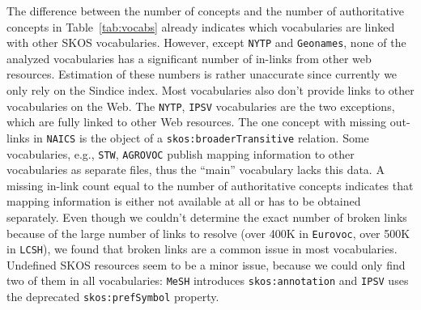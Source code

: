 
The difference between the number of concepts and the number of authoritative concepts in Table~\ref{tab:vocabs} already indicates which vocabularies are linked with other SKOS vocabularies.
However, except \texttt{NYTP} and \texttt{Geonames}, none of the analyzed vocabularies has a significant number of in-links from other web resources. Estimation of these numbers is rather unaccurate since currently we only rely on the Sindice index. 
Most vocabularies also don't provide links to other vocabularies on the Web. The \texttt{NYTP}, \texttt{IPSV} vocabularies are the two exceptions, which are fully linked to other Web resources. The one concept with missing out-links in \texttt{NAICS} is the object of a \texttt{skos:broaderTransitive} relation. Some vocabularies, e.g., \texttt{STW}, \texttt{AGROVOC} publish mapping information to other vocabularies as separate files, thus the ``main'' vocabulary lacks this data. A missing in-link count equal to the number of authoritative concepts indicates that mapping information is either not available at all or has to be obtained separately.
Even though we couldn't determine the exact number of broken links because of the large number of links to resolve  (over 400K in \texttt{Eurovoc}, over 500K in \texttt{LCSH}), we found that broken links are a common issue in most vocabularies.
Undefined SKOS resources seem to be a minor issue, because we could only find two of them in all vocabularies: \texttt{MeSH} introduces \texttt{skos:annotation} and \texttt{IPSV} uses the deprecated \texttt{skos:prefSymbol} property.

